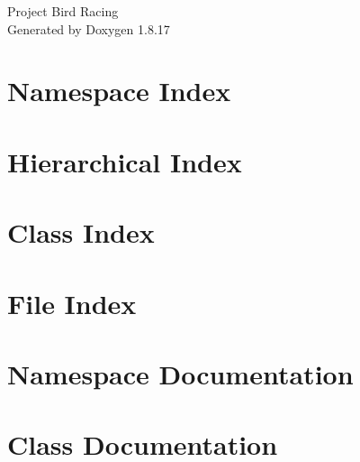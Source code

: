 \let\mypdfximage\pdfximage\def\pdfximage{\immediate\mypdfximage}\documentclass[twoside]{book}
\newcommand{\+}{\discretionary{\mbox{\scriptsize$\hookleftarrow$}}{}{}}
\newcommand{\clearemptydoublepage}{%
  \newpage{\pagestyle{empty}\cleardoublepage}%
}
\begin{document}
\hypersetup{pageanchor=false,
             bookmarksnumbered=true,
             pdfencoding=unicode
            }
\begin{titlepage}
\vspace*{7cm}
\begin{center}%
{\Large Project Bird Racing }\\
\vspace*{1cm}
{\large Generated by Doxygen 1.8.17}\\
\end{center}
\end{titlepage}
\clearemptydoublepage
{}
\tableofcontents
\clearemptydoublepage
{}
\hypersetup{pageanchor=true}

\chapter{Namespace Index}

\chapter{Hierarchical Index}

\chapter{Class Index}

\chapter{File Index}

\chapter{Namespace Documentation}










\chapter{Class Documentation}










\end{document}
